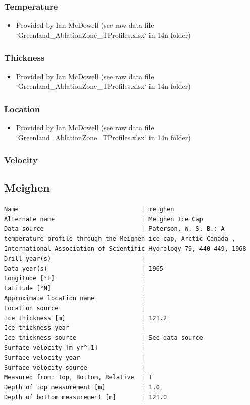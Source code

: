 \documentclass[article,a4paper,times,11pt,twoside]{article}
\begin{document}
\subsubsection{Temperature}
\label{sec:orge53f0a1}

\begin{itemize}
\item Provided by Ian McDowell (see raw data file `Greenland\_AblationZone\_TProfiles.xlsx` in 14n folder)
\end{itemize}

\subsubsection{Thickness}
\label{sec:org0248b8f}

\begin{itemize}
\item Provided by Ian McDowell (see raw data file `Greenland\_AblationZone\_TProfiles.xlsx` in 14n folder)
\end{itemize}

\subsubsection{Location}
\label{sec:org1cb9c2f}

\begin{itemize}
\item Provided by Ian McDowell (see raw data file `Greenland\_AblationZone\_TProfiles.xlsx` in 14n folder)
\end{itemize}

\subsubsection{Velocity}
\label{sec:org6fc60a1}
\clearpage
\subsection{Meighen}
\label{sec:org93aec96}
\begin{verbatim}
Name                                  | meighen
Alternate name                        | Meighen Ice Cap
Data source                           | Paterson, W. S. B.: A temperature profile through the Meighen ice cap, Arctic Canada , International Association of Scientific Hydrology 79, 440–449, 1968 
Drill year(s)                         | 
Data year(s)                          | 1965
Longitude [°E]                        | 
Latitude [°N]                         | 
Approximate location name             | 
Location source                       | 
Ice thickness [m]                     | 121.2
Ice thickness year                    | 
Ice thickness source                  | See data source
Surface velocity [m yr^-1]            | 
Surface velocity year                 | 
Surface velocity source               | 
Measured from: Top, Bottom, Relative  | T
Depth of top measurement [m]          | 1.0
Depth of bottom measurement [m]       | 121.0
\end{verbatim}
\end{document}
